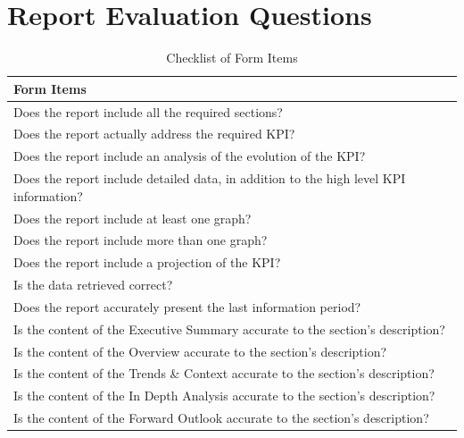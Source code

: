 \documentclass[a4paper]{report}
\begin{document}
\chapter{Report Evaluation Questions}
\label{annex:evaluation}

\begin{table}[H]
\centering
\begin{tabular}{|p{14cm}|}
    \hline
    \textbf{Form Items} \\ \hline
    Does the report include all the required sections? \\ \hline
    Does the report actually address the required KPI? \\ \hline
    Does the report include an analysis of the evolution of the KPI? \\ \hline
    Does the report include detailed data, in addition to the high level KPI information? \\ \hline
    Does the report include at least one graph? \\ \hline
    Does the report include more than one graph? \\ \hline
    Does the report include a projection of the KPI? \\ \hline
    Is the data retrieved correct? \\ \hline
    Does the report accurately present the last information period? \\ \hline
    Is the content of the Executive Summary accurate to the section's description? \\ \hline
    Is the content of the Overview accurate to the section's description? \\ \hline
    Is the content of the Trends \& Context accurate to the section's description? \\ \hline
    Is the content of the In Depth Analysis accurate to the section's description? \\ \hline
    Is the content of the Forward Outlook accurate to the section's description? \\ \hline
\end{tabular}
\caption{Checklist of Form Items}
\end{table}
\end{document}
